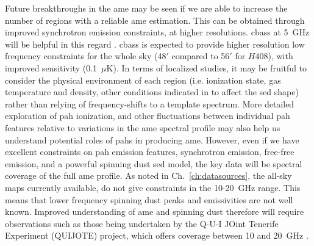                 Future breakthroughs in the \gls{ame} may be seen if we are able to increase the number of regions with a reliable \gls{ame} estimation. This can be obtained through improved synchrotron emission constraints, at higher resolutions. \gls{cbass} at 5~GHz will be helpful in this regard \citep{irfan15}. \gls{cbass} is expected to provide higher resolution low frequency constraints for the whole sky (48$'$ compared to 56$'$ for $H408$), with improved sensitivity (0.1~$\mu$K). In terms of localized studies, it may be fruitful to consider the physical environment of each region (i.e. ionization state, gas temperature and density, other conditions indicated in \cite{draine98a, ali-haimoud10} to affect the \gls{sed} shape) rather than relying of frequency-shifts to a template spectrum. More detailed exploration of \gls{pah} ionization, and other fluctuations between individual \gls{pah} features relative to variations in the \gls{ame} spectral profile may also help us understand potential roles of \gls{pah}s in producing \gls{ame}. However, even if we have excellent constraints on \gls{pah} emission features, synchrotron emission, free-free emission, and a powerful spinning dust \gls{sed} model, the key data will be spectral coverage of the full \gls{ame} profile. As noted in Ch.~\ref{ch:datasources}, the all-sky maps currently available, do not give constraints in the 10-20~GHz range. This means that lower frequency spinning dust peaks and emissivities are not well known. Improved understanding of \gls{ame} and spinning dust therefore will require observations such as those being undertaken by the Q-U-I JOint Tenerife Experiment (QUIJOTE) project, which offers coverage between 10 and 20~GHz \citep{santos15}.
